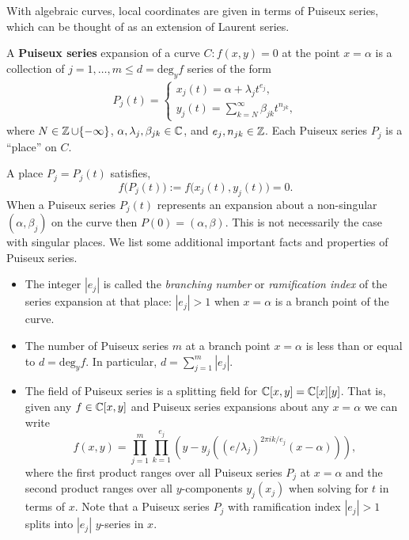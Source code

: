 With algebraic curves, local coordinates are given in terms of Puiseux series,
which can be thought of as an extension of Laurent series.
\begin{definition} \label{def: puiseux} A {\bf Puiseux series} expansion of a
  curve $C : f(x,y) = 0$ at the point $x=\alpha$ is a collection of $j =
  1,\ldots,m \leq d = \text{deg}_y f$ series of the form
  \begin{align*}
    P_j(t) =
    \begin{cases}
      x_j(t) = \alpha + \lambda_j t^{e_j}, \\
      y_j(t) = \sum_{k=N}^\infty \beta_{jk} t^{n_{jk}},
    \end{cases}
  \end{align*}
  where $N \in \operatorname{\mathbb{Z}} \cup \{-\infty\}$, $\alpha, \lambda_j, \beta_{jk} \in \operatorname{\mathbb{C}}$,
  and $e_j,n_{jk} \in \operatorname{\mathbb{Z}}$. Each Puiseux series $P_j$ is a ``place'' on $C$.
\end{definition}
A place $P_j = P_j(t)$ satisfies,
\[
    f\big(P_j(t)\big) := f\big(x_j(t), y_j(t)\big) = 0.
\]
When a Puiseux series $P_j(t)$ represents an expansion about a non-singular
$(\alpha, \beta_j)$ on the curve then $P(0) = (\alpha,\beta)$. This is not
necessarily the case with singular places. We list some additional important
facts and properties of Puiseux series.
\begin{itemize}
\item The integer $|e_j|$ is called the {\it branching number} or {\it
    ramification index} of the series expansion at that place: $|e_j| > 1$ when
  $x = \alpha$ is a branch point of the curve.
\item The number of Puiseux series $m$ at a branch point $x = \alpha$ is less
  than or equal to $d = \text{deg}_y f$. In particular, $d = \sum_{j=1}^m
  |e_j|$.
\item The field of Puiseux series is a splitting field for $\operatorname{\mathbb{C}}[x,y] =
  \operatorname{\mathbb{C}}[x][y]$. That is, given any $f \in \operatorname{\mathbb{C}}[x,y]$ and Puiseux series expansions
  about any $x=\alpha$ we can write
  \[
    f(x,y) = \prod_{j=1}^m \prod_{k=1}^{e_j} \left( y - y_j\left(
             (e/\lambda_j)^{2 \pi ik / e_j}(x-\alpha) \right) \right),
  \]
  where the first product ranges over all Puiseux series $P_j$ at $x=\alpha$ and
  the second product ranges over all $y$-components $y_j(x_j)$ when solving for
  $t$ in terms of $x$. Note that a Puiseux series $P_j$ with ramification index
  $|e_j|>1$ splits into $|e_j|$ $y$-series in $x$.
\end{itemize}

